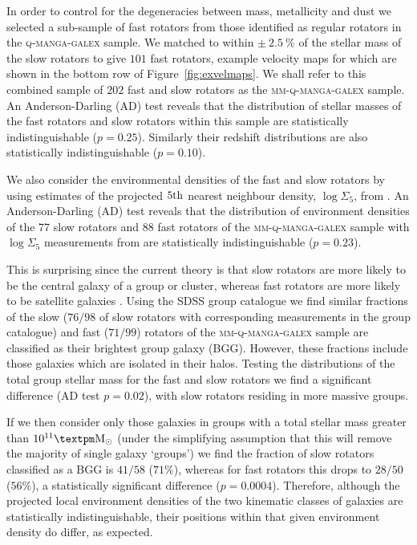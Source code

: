 \documentclass[useAMS,usenatbib]{mn2e}
\begin{document}
In order to control for the degeneracies between mass, metallicity and dust we selected a sub-sample of fast rotators from those identified as regular rotators in the \textsc{q-manga-galex} sample. We matched to within $\pm~2.5~\%$ of the stellar mass of the slow rotators to give $101$ fast rotators, example velocity maps for which are shown in the bottom row of Figure~\ref{fig:exvelmaps}. We shall refer to this combined sample of $202$ fast and slow rotators as the \textsc{mm-q-manga-galex} sample. An Anderson-Darling (AD) test reveals that the distribution of stellar masses of the fast rotators and slow rotators within this sample are statistically indistinguishable ($p=0.25$). Similarly their redshift distributions are also statistically indistinguishable ($p=0.10$).

We also consider the environmental densities of the fast and slow rotators by using estimates of the projected $5\rm{th}$ nearest neighbour density,  $\log\Sigma_5$, from \cite{bamford09}. An Anderson-Darling (AD) test reveals that the distribution of environment densities of the $77$ slow rotators and $88$ fast rotators of the \textsc{mm-q-manga-galex} sample with $\log\Sigma_5$ measurements from \cite{bamford09} are statistically indistinguishable ($p=0.23$). 

This is surprising since the current theory is that slow rotators are more likely to be the central galaxy of a group or cluster, whereas fast rotators are more likely to be satellite galaxies \citep{cappellari11, deugenio13, houghton13, scott14}. Using the \cite{yang09} SDSS group catalogue we find similar fractions of the slow ($76/98$ of slow rotators with corresponding measurements in the \citeauthor{yang09} group catalogue) and fast ($71/99$) rotators of the \textsc{mm-q-manga-galex} sample are classified as their brightest group galaxy (BGG). However, these fractions include those galaxies which are isolated in their halos. Testing the distributions of the total group stellar mass for the fast and slow rotators we find a significant difference (AD test $p=0.02$), with slow rotators residing in more massive groups. 

If we then consider only those galaxies in groups with a total stellar mass greater than $10^{11}±\rm{M}_{\odot}$ (under the simplifying assumption that this will remove the majority of single galaxy `groups') we find the fraction of slow rotators classified as a BGG is $41/58$ ($71\%$), whereas for fast rotators this drops to $28/50$ ($56\%$), a statistically significant difference ($p=0.0004$). Therefore, although the projected local environment densities of the two kinematic classes of galaxies are statistically indistinguishable, their positions within that given environment density do differ, as expected. 
\end{document}
